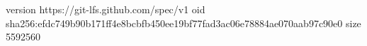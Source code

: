 version https://git-lfs.github.com/spec/v1
oid sha256:efdc749b90b171ff4e8bcbfb450ee19bf77fad3ac06e78884ae070aab97c90e0
size 5592560
